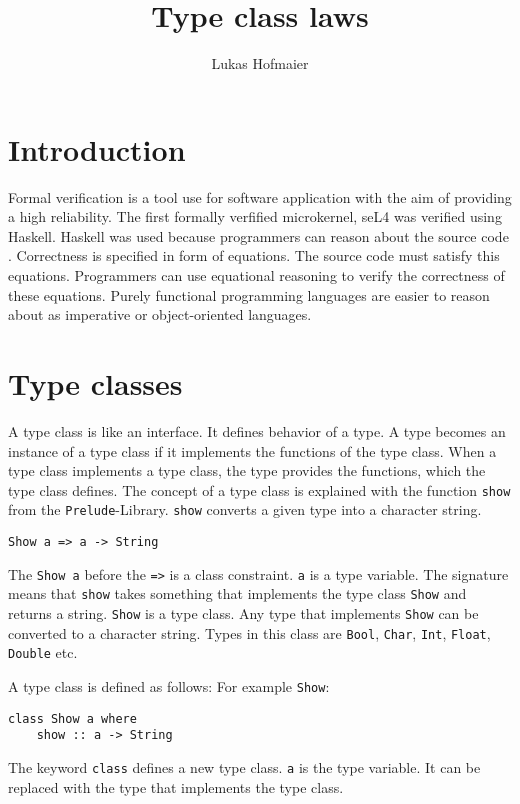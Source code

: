 \documentclass[twoside, a4paper]{article}
\author{Lukas Hofmaier}
\title{Type class laws}
\begin{document}
\maketitle
\tableofcontents

\section{Introduction}
\label{sec:intro}

Formal verification is a tool use for software application with the aim of providing a high reliability. The first formally verfified microkernel, seL4 was verified using Haskell. Haskell was used because programmers can reason about the source code \cite{Klein09}. Correctness is specified in form of equations. The source code must satisfy this equations. Programmers can use equational reasoning to verify the correctness of these equations.
Purely functional programming languages are easier to reason about as imperative or object-oriented languages.

\section{Type classes}
\label{sec:typeclasses}

A type class is like an interface. It defines behavior of a type. A type becomes an instance of a type class if it implements the functions of the type class. When a type class implements a type class, the type provides the functions, which the type class defines.
The concept of a type class is explained with the function \verb|show| from the \verb|Prelude|-Library. \verb|show| converts a given type into a character string.
\begin{verbatim}
Show a => a -> String
\end{verbatim}
The \verb|Show a| before the \verb|=>| is a class constraint. \verb|a| is a type variable. The signature means that \verb|show| takes something that implements the type class \verb|Show| and returns a string. \verb|Show| is a type class. Any type that implements \verb|Show| can be converted to a character string. Types in this class are \verb|Bool|, \verb|Char|, \verb|Int|, \verb|Float|, \verb|Double| etc.

A type class is defined as follows: For example \verb|Show|:
\begin{verbatim}
class Show a where
    show :: a -> String
\end{verbatim}
The keyword \verb|class| defines a new type class. \verb|a| is the type variable. It can be replaced with the type that implements the type class.
\end{document}
